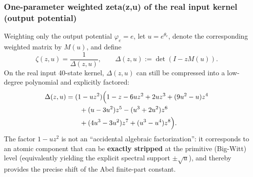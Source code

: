 \subsubsection{One-parameter weighted zeta(z,u) of the real input kernel (output potential)}\label{app:real-input-40-zeta-u}
Weighting only the output potential $\varphi_e=e$, let $u=e^{\theta_e}$, denote the corresponding weighted matrix by $M(u)$, and define
\[
\zeta(z,u)=\frac{1}{\Delta(z,u)},\qquad \Delta(z,u):=\det(I-zM(u)).
\]
On the real input 40-state kernel, $\Delta(z,u)$ can still be compressed into a low-degree polynomial and explicitly factored:
\[
\begin{aligned}
\Delta(z,u)&=(1-uz^2)\Bigl(
1-z-6uz^2+2uz^3+(9u^2-u)z^4\\
&\qquad +(u-3u^2)z^5-(u^3+2u^2)z^6\\
&\qquad +(4u^3-3u^2)z^7+(u^3-u^4)z^8
\Bigr).
\end{aligned}
\]
The factor $1-uz^2$ is not an ``accidental algebraic factorization'': it corresponds to an atomic component that can be \textbf{exactly stripped} at the primitive (Big-Witt) level (equivalently yielding the explicit spectral support \(\pm\sqrt u\)), and thereby provides the precise shift of the Abel finite-part constant.

